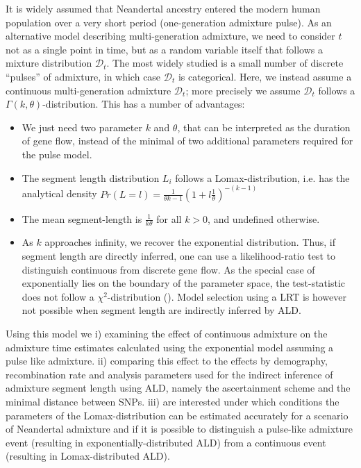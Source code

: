 \documentclass[]{article}
\begin{document}
It is widely assumed that Neandertal ancestry entered the modern human
population over a very short period (one-generation admixture pulse). As an alternative model describing multi-generation admixture, we need to
consider \(t\) not as a single point in time, but as a random variable
itself that follows a mixture distribution \(\mathcal{D}_t\). The most
widely studied is a small number of discrete ``pulses'' of admixture, in
which case \(\mathcal{D}_t\) is categorical. Here, we instead assume a
continuous multi-generation admixture \(\mathcal{D}_t\); more precisely we assume \(\mathcal{D}_t\)
follows a \(\Gamma(k, \theta)\)-distribution. This has a number of
advantages:

\begin{itemize}
    \item We just need two parameter $k$ and $\theta$, that can be interpreted as the duration of gene flow, instead of the minimal of two additional parameters required for the pulse model.
    \item The segment length distribution $L_i$ follows a Lomax-distribution, i.e. has the analytical density $Pr(L=l) = \frac{1}{\theta k-1} (1+l\frac{1}{\theta})^{-(k-1)}$
    \item The mean segment-length is  $\frac{1}{k \theta}$ for all $k > 0$, and undefined otherwise. 
    \item As $k$ approaches infinity, we recover the exponential distribution. Thus, if segment length are directly inferred, one can use a likelihood-ratio test to distinguish continuous from discrete gene flow. As the special case of exponentially lies on the boundary of the parameter space, the test-statistic does not follow a $\chi^2$-distribution (\cite{Kozubowski_Testing_2008}). Model selection using a LRT is however not possible when segment length are indirectly inferred by ALD.
\end{itemize}

Using this model we i) examining the effect of continuous admixture on
the admixture time estimates calculated using the exponential model
assuming a pulse like admixture. ii) comparing this effect to the
effects by demography, recombination rate and analysis parameters used
for the indirect inference of admixture segment length using ALD, namely
the ascertainment scheme and the minimal distance between SNPs. iii) are
interested under which conditions the parameters of the
Lomax-distribution can be estimated accurately for a scenario of
Neandertal admixture and if it is possible to distinguish a pulse-like
admixture event (resulting in exponentially-distributed ALD)
from a continuous event (resulting in Lomax-distributed ALD).
\end{document}
